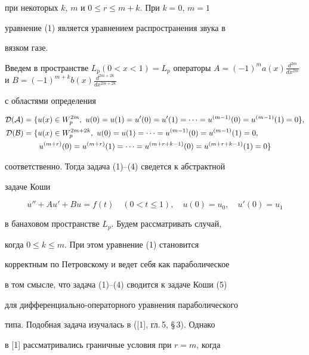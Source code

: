 при некоторых $k$, $m$ и $0\le r\le m+k$. При $k=0$, $m=1$ 


уравнение (1) является уравнением распространения звука в  


вязком газе. 


 


Введем в пространстве $L_p(0<x<1)=L_p$ операторы $A=(-1)^m 


a(x)\frac{d^{2m}}{d x^{2m}}$ и $B=(-1)^{m+k}b(x)\frac{d^{2m+2k}}{d 


x^{2m+2k}}$ 


с областями определения 


\begin{align*} 


\cal D(A)&=\{u(x)\in W^{2m}_p,\ u(0)=u(1)=u'(0)=u'(1)= 


\dotsb=u^{(m-1)}(0)=u^{(m-1)}(1)=0\}, \\ 


\cal D(B)&=\{u(x)\in W^{2m+2k}_p,\ u(0)=u(1)=\dotsb=u^{(m-1)}(0)= 


u^{(m-1)}(1)=0,\\


&\qquad u^{(m+r)}(0)=u^{(m+r)}(1)=\dotsb= 


u^{(m+r+k-1)}(0)=u^{(m+r+k-1)}(1)=0\} 


\end{align*} 


соответственно. Тогда задача (1)--(4) сведется к абстрактной  


задаче Коши 


\begin{equation} 


u''+A u'+B u=f(t)\quad (0<t\le 1),\quad u(0)=u_0,\quad 


u'(0)=u_1 


\end{equation} 


в банаховом пространстве $L_p$. Будем рассматривать случай,  


когда $0\le k\le m$. При этом уравнение (1) становится  


корректным по Петровскому и ведет себя как параболическое  


в том смысле, что задача (1)--(4) сводится к задаче Коши (5)  


для дифференциально-операторного уравнения параболического  


типа. Подобная задача изучалась в ([1], гл.\,5, \S\,3). Однако 


в [1] рассматривались граничные условия при $r=m$, когда  


